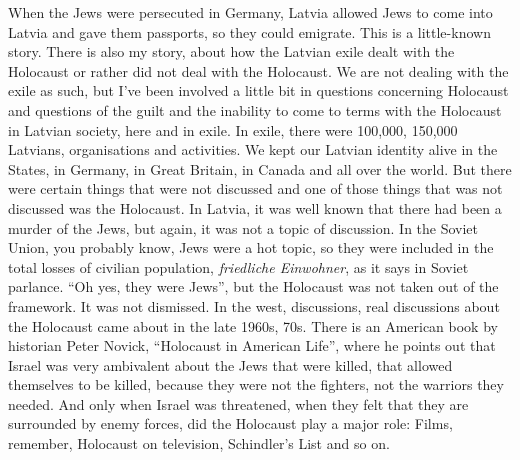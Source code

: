 When the Jews were persecuted in Germany, Latvia allowed Jews to come into Latvia and gave them passports, so they could emigrate. This is a little-known story. There is also my story, about how the Latvian exile dealt with the Holocaust or rather did not deal with the Holocaust. We are not dealing with the exile as such, but I've been involved a little bit in questions concerning Holocaust and questions of the guilt and the inability to come to terms with the Holocaust in Latvian society, here and in exile. In exile, there were 100,000, 150,000 Latvians, organisations and activities. We kept our Latvian identity alive in the States, in Germany, in Great Britain, in Canada and all over the world. But there were certain things that were not discussed and one of those things that was not discussed was the Holocaust. In Latvia, it was well known that there had been a murder of the Jews, but again, it was not a topic of discussion. In the Soviet Union, you probably know, Jews were a hot topic, so they were included in the total losses of civilian population, \textit{friedliche Einwohner}, as it says in Soviet parlance. ``Oh yes, they were Jews'', but the Holocaust was not taken out of the framework. It was not dismissed. In the west, discussions, real discussions about the Holocaust came about in the late 1960s, 70s. There is an American book by historian Peter Novick, ``Holocaust in American Life'', where he points out that Israel was very ambivalent about the Jews that were killed, that allowed themselves to be killed, because they were not the fighters, not the warriors they needed. And only when Israel was threatened, when they felt that they are surrounded by enemy forces, did the Holocaust play a major role: Films, remember, Holocaust on television, Schindler's List and so on.\\
